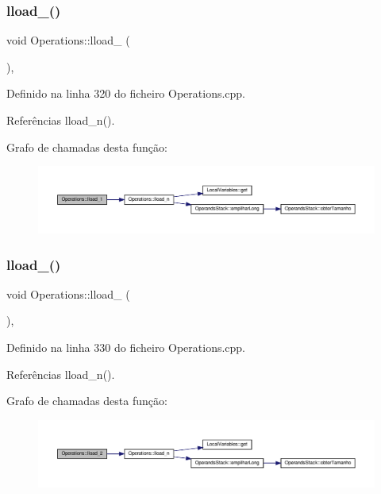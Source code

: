 \subsubsection{\texorpdfstring{lload\+\_()}{lload\_1()}}
{\footnotesize\ttfamily void Operations\+::lload\+\_ (\begin{DoxyParamCaption}{ }\end{DoxyParamCaption})\hspace{0.3cm}{\ttfamily [static]}, {\ttfamily [private]}}



Definido na linha 320 do ficheiro Operations.\+cpp.



Referências lload\+\_\+n().

Grafo de chamadas desta função\+:
\nopagebreak
\begin{figure}[H]
\begin{center}
\leavevmode
\includegraphics[width=350pt]{classOperations_a34e91f6520ca574abce6b2b30ce91948_cgraph}
\end{center}
\end{figure}
\mbox{\label{classOperations_aa59772a5ed2bd59de3d54c635f294e93}} 
\subsubsection{\texorpdfstring{lload\+\_()}{lload\_2()}}
{\footnotesize\ttfamily void Operations\+::lload\+\_ (\begin{DoxyParamCaption}{ }\end{DoxyParamCaption})\hspace{0.3cm}{\ttfamily [static]}, {\ttfamily [private]}}



Definido na linha 330 do ficheiro Operations.\+cpp.



Referências lload\+\_\+n().

Grafo de chamadas desta função\+:
\nopagebreak
\begin{figure}[H]
\begin{center}
\leavevmode
\includegraphics[width=350pt]{classOperations_aa59772a5ed2bd59de3d54c635f294e93_cgraph}
\end{center}
\end{figure}
\mbox{\label{classOperations_af2f8b1e41b734f43e73d9d6811eb427b}} 
